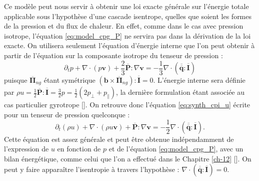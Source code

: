 Ce modèle peut nous servir à obtenir une loi exacte générale sur l'énergie totale applicable sous l'hypothèse d'une cascade isentrope, quelles que soient les formes de la pression et du flux de chaleur. En effet, comme dans le cas avec pression isotrope, l'équation \eqref{eq:model_cpg_P} ne servira pas dans la dérivation de la loi exacte. On utilisera seulement l'équation d'énergie interne que l'on peut obtenir à partir de l'équation sur la composante isotrope du tenseur de pression : 
\begin{equation}
\label{eq:model_cpg_p}     \partial_t p + \nabla \cdot \left(p \boldsymbol{v} \right) + \frac{2}{3} \overline{\boldsymbol{P}} : \nabla \boldsymbol{v}   = - \frac{1}{3} \nabla \cdot \left(\overline{\overline{\boldsymbol{q}}} : \overline{\boldsymbol{I}}\right)
\end{equation}
puisque $\overline{\boldsymbol{\Pi}}_{ng}$ étant symétrique $\left(\boldsymbol{b}\times \overline{\boldsymbol{\Pi}}_{ng}\right):\overline{\boldsymbol{I}} = 0$.
L'énergie interne sera définie par $\rho u = \frac{1}{2} \overline{\boldsymbol{P}} : \overline{\boldsymbol{I}} = \frac{3}{2} p = \frac{1}{2} \left(2 p_{\perp} + p_{\parallel} \right) $, la dernière formulation étant associée au cas particulier gyrotrope [\cite{hazeltine_local_2013}].
On retrouve donc l'équation \eqref{eq:synth_cpi_u} écrite pour un tenseur de pression quelconque : 
\begin{equation}
\label{eq:model_cpg_u}     \partial_t \left(\rho u\right) + \nabla \cdot \left(\rho u \boldsymbol{v} \right) +  \overline{\boldsymbol{P}} : \nabla \boldsymbol{v}   = - \frac{1}{2} \nabla \cdot \left(\overline{\overline{\boldsymbol{q}}} : \overline{\boldsymbol{I}}\right) .
\end{equation}
Cette équation est assez générale et peut être obtenue indépendamment de l'expression de $u$ en fonction de $p$ et de l'équation \eqref{eq:model_cpg_P}, avec un bilan énergétique, comme celui que l'on a effectué dans le Chapitre \ref{ch-12} [\cite{eckart_thermodynamics_1940,hazeltine_local_2013}]. On peut y faire apparaître l'isentropie à travers l'hypothèse : $ \nabla \cdot \left(\overline{\overline{\boldsymbol{q}}} : \overline{\boldsymbol{I}}\right) = 0$.  


